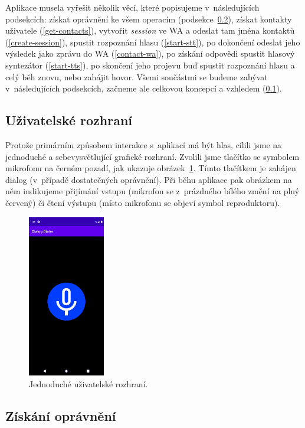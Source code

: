 Aplikace musela vyřešit několik věcí, které popisujeme
v~následujících podsekcích: získat oprávnění ke všem operacím (podsekce~\ref{get-permissions}),
získat kontakty uživatele (\ref{get-contacts}), vytvořit \textit{session} ve WA a odeslat
tam jména kontaktů (\ref{create-session}), spustit rozpoznání hlasu (\ref{start-stt}), po dokončení odeslat jeho výsledek
jako zprávu do WA (\ref{contact-wa}), po získání odpovědi spustit hlasový syntezátor (\ref{start-tts}), po skončení
jeho projevu buď spustit rozpoznání hlasu a celý běh znovu, nebo zahájit
hovor. Všemi součástmi se budeme zabývat v~následujících podsekcích, začneme
ale celkovou koncepcí a vzhledem (\ref{desc-ui}).

\subsection{Uživatelské rozhraní}\label{desc-ui}

Protože primárním způsobem interakce
s~aplikací má být hlas, cílili jsme na jednoduché a sebevysvětlující grafické
rozhraní. Zvolili jsme tlačítko se symbolem mikrofonu na černém pozadí,
jak ukazuje obrázek~\ref{img-ui}. Tímto tlačítkem je zahájen dialog (v~případě
dostatečných oprávnění). Při běhu aplikace
pak obrázkem na něm indikujeme přijímání vstupu (mikrofon se z~prázdného bílého
změní na plný červený) či čtení výstupu (místo mikrofonu se objeví symbol reproduktoru).

\begin{figure}[h]
    \centering
    \includegraphics[width=0.3\textwidth]{../img/ui.pdf}
    \caption{Jednoduché uživatelské rozhraní.}\label{img-ui}
\end{figure}

\subsection{Získání oprávnění}\label{get-permissions}

